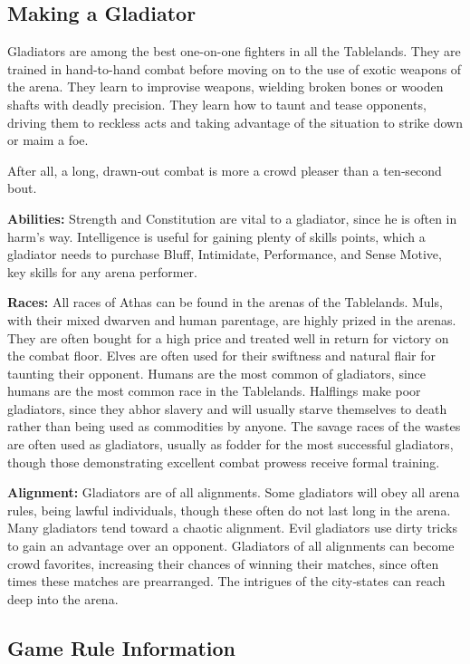 \subsection{Making a Gladiator}
Gladiators are among the best one-on-one fighters in all the Tablelands. They are trained in hand-to-hand combat before moving on to the use of exotic weapons of the arena. They learn to improvise weapons, wielding broken bones or wooden shafts with deadly precision. They learn how to taunt and tease opponents, driving them to reckless acts and taking advantage of the situation to strike down or maim a foe.

After all, a long, drawn‐out combat is more a crowd pleaser than a ten‐second bout.

\textbf{Abilities:} Strength and Constitution are vital to a gladiator, since he is often in harm’s way. Intelligence is useful for gaining plenty of skills points, which a gladiator needs to purchase Bluff, Intimidate, Performance, and Sense Motive, key skills for any arena performer.

\textbf{Races:} All races of Athas can be found in the arenas of the Tablelands. Muls, with their mixed dwarven and human parentage, are highly prized in the arenas. They are often bought for a high price and treated well in return for victory on the combat floor. Elves are often used for their swiftness and natural flair for taunting their opponent. Humans are the most common of gladiators, since humans are the most common race in the Tablelands. Halflings make poor gladiators, since they abhor slavery and will usually starve themselves to death rather than being used as commodities by anyone. The savage races of the wastes are often used as gladiators, usually as fodder for the most successful gladiators, though those demonstrating excellent combat prowess receive formal training.

\textbf{Alignment:} Gladiators are of all alignments. Some gladiators will obey all arena rules, being lawful individuals, though these often do not last long in the arena. Many gladiators tend toward a chaotic alignment. Evil gladiators use dirty tricks to gain an advantage over an opponent. Gladiators of all alignments can become crowd favorites, increasing their chances of winning their matches, since often times these matches are prearranged. The intrigues of the city‐states can reach deep into the arena.

\subsection{Game Rule Information}

